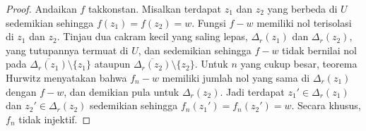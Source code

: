 \documentclass[12pt,openany]{book}
\theoremstyle{plain}
\theoremstyle{remark}
\theoremstyle{definition}
\theoremstyle{exercise}
\theoremstyle{example}
\begin{document}
\begin{proof}
Andaikan $f$ takkonstan.
Misalkan terdapat $z_1$ dan $z_2$ yang berbeda di $U$ sedemikian sehingga $f(z_1) =
f(z_2) = w$.  Fungsi $f-w$ memiliki nol terisolasi di $z_1$ dan $z_2$.
Tinjau dua cakram kecil yang saling lepas, $\Delta_r(z_1)$ dan $\Delta_r(z_2)$,
yang tutupannya termuat di $U$,
dan sedemikian sehingga $f-w$ tidak bernilai nol pada
$\overline{\Delta_r(z_1)} \setminus \{ z_1 \}$ ataupun
$\overline{\Delta_r(z_2)} \setminus \{ z_2 \}$.
Untuk $n$ yang cukup besar, teorema Hurwitz menyatakan bahwa $f_n-w$ memiliki jumlah
nol yang sama di $\Delta_r(z_1)$ dengan $f-w$, dan demikian pula untuk $\Delta_r(z_2)$.
Jadi terdapat $z_1' \in \Delta_r(z_1)$ dan
$z_2' \in \Delta_r(z_2)$ sedemikian sehingga $f_n(z_1')=f_n(z_2')=w$.
Secara khusus, $f_n$ tidak injektif.
\end{proof}
\end{document}
